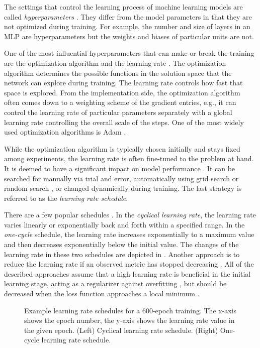 The settings that control the learning process of machine learning models are called \emph{hyperparameters} \cite{Goodfellow-et-al-2016}. They differ from the model parameters in that they are not optimized during training. For example, the number and size of layers in an \ac{MLP} are hyperparameters but the weights and biases of particular units are not.

One of the most influential hyperparameters that can make or break the training are the optimization algorithm and the learning rate \cite{Goodfellow-et-al-2016,Bengio2012}. The optimization algorithm determines the possible functions in the solution space that the network can explore during training. The learning rate controls how fast that space is explored. From the implementation side, the optimization algorithm often comes down to a weighting scheme of the gradient entries, e.g., it can control the learning rate of particular parameters separately with a global learning rate controlling the overall scale of the steps. One of the most widely used optimization algorithms is Adam \cite{Kingma2017}.

While the optimization algorithm is typically chosen initially and stays fixed among experiments, the learning rate is often fine-tuned to the problem at hand. It is deemed to have a significant impact on model performance \cite{Goodfellow-et-al-2016,Bengio2012}. It can be searched for manually via trial and error, automatically using grid search or random search \cite{Goodfellow-et-al-2016}, or changed dynamically during training. The last strategy is referred to as the \emph{learning rate schedule}.

There are a few popular schedules \cite{Smith2018}. In the \emph{cyclical learning rate}, the learning rate varies linearly or exponentially back and forth within a specified range. In the \emph{one-cycle} schedule, the learning rate increases exponentially to a maximum value and then decreases exponentially below the initial value. The changes of the learning rate in these two schedules are depicted in . Another approach is to reduce the learning rate if an observed metric has stopped decreasing \cite{Pytorch}. All of the described approaches assume that a high learning rate is beneficial in the initial learning stage, acting as a regularizer against overfitting \cite{Smith2018}, but should be decreased when the loss function approaches a local minimum \cite{Goodfellow-et-al-2016}. 

\begin{figure}
  \centering
    
  \caption{Example learning rate schedules for a 600-epoch training. The x-axis shows the epoch number, the y-axis shows the learning rate value in the given epoch. (Left) Cyclical learning rate schedule. (Right) One-cycle learning rate schedule.}
  \label{fig:learning_rate_schedules}
\end{figure}

